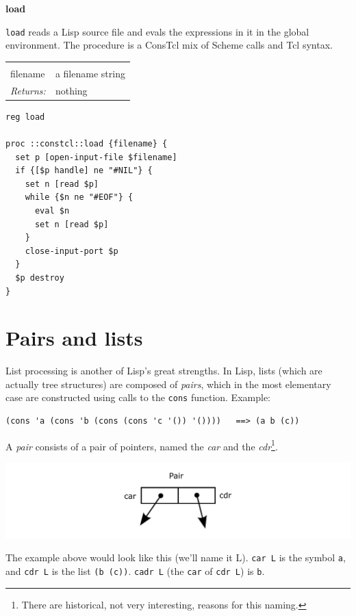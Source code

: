 \documentclass[twoside]{report}
\begin{document}
\textbf{load}

\texttt{load} reads a Lisp source file and evals the expressions in it in the global environment. The procedure is a ConsTcl mix of Scheme calls and Tcl syntax.

\noindent\begin{tabular}{ |p{1.9cm} p{8cm}| }
\hline
\rowcolor[HTML]{CCCCCC} \multicolumn{2}{|l|}{\bf load (public)} \\
filename & a filename string \\
\textit{Returns:} & nothing \\
\hline
\end{tabular}

\begin{lstlisting}
reg load

proc ::constcl::load {filename} {
  set p [open-input-file $filename]
  if {[$p handle] ne "#NIL"} {
    set n [read $p]
    while {$n ne "#EOF"} {
      eval $n
      set n [read $p]
    }
    close-input-port $p
  }
  $p destroy
}
\end{lstlisting}

\section{Pairs and lists}
\label{pairs-and-lists}

List processing is another of Lisp's great strengths. In Lisp, lists (which are actually tree structures) are composed of \emph{pairs}, which in the most elementary case are constructed using calls to the \texttt{cons} function. Example:

\begin{verbatim}
(cons 'a (cons 'b (cons (cons 'c '()) '())))   ==> (a b (c))
\end{verbatim}

A \emph{pair} consists of a pair of pointers, named the \emph{car} and the \emph{cdr}\footnote{There are historical, not very interesting, reasons for this naming.}.

\includegraphics{images/pair.png}

The example above would look like this (we'll name it L). \texttt{car L} is the symbol \texttt{a}, and \texttt{cdr L} is the list \texttt{(b (c))}. \texttt{cadr L} (the \texttt{car} of \texttt{cdr L}) is \texttt{b}.
\end{document}
